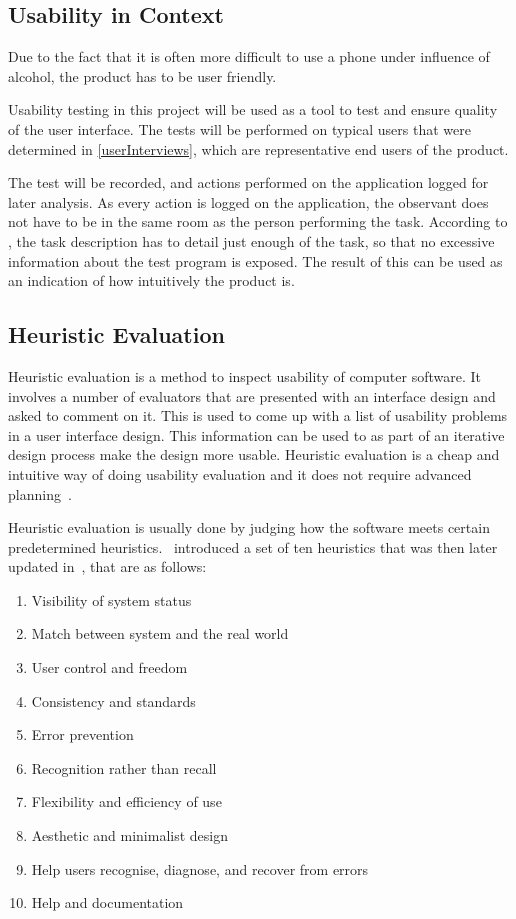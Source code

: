 \subsection{Usability in Context}
\label{sub:usability_in_context}

Due to the fact that it is often more difficult to use a phone under influence of alcohol, the product has to be user friendly.

Usability testing in this project will be used as a tool to test and ensure quality of the user interface. The tests will be performed on typical users that were determined in \cref{userInterviews}, which are representative end users of the product.

The test will be recorded, and actions performed on the application logged for later analysis. As every action is logged on the application, the observant does not have to be in the same room as the person performing the task. According to \cite{RubinChisnellSpool08}, the task description has to detail just enough of the task, so that no excessive information about the test program is exposed. The result of this can be used as an indication of how intuitively the product is.

\subsection{Heuristic Evaluation}
Heuristic evaluation is a method to inspect usability of computer software. It involves a number of evaluators that are presented with an interface design and asked to comment on it. This is used to come up with a list of usability problems in a user interface design. This information can be used to as part of an iterative design process make the design more usable. Heuristic evaluation is a cheap and intuitive way of doing usability evaluation and it does not require advanced planning~\cite{Nielsen1990}.

Heuristic evaluation is usually done by judging how the software meets certain predetermined heuristics.~\cite{Nielsen1990} introduced a set of ten heuristics that was then later updated in~\cite{Nielsen1994}, that are as follows:

\begin{enumerate}
  \item Visibility of system status
  \item Match between system and the real world
  \item User control and freedom
  \item Consistency and standards
  \item Error prevention
  \item Recognition rather than recall
  \item Flexibility and efficiency of use
  \item Aesthetic and minimalist design
  \item Help users recognise, diagnose, and recover from errors
  \item Help and documentation
\end{enumerate}

